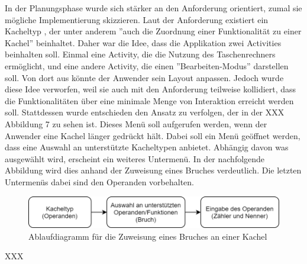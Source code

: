 In der Planungsphase wurde sich stärker an den Anforderung orientiert, zumal sie mögliche Implementierung skizzieren. Laut der Anforderung existiert ein Kacheltyp , der unter anderem ''auch die Zuordnung einer Funktionalität zu einer Kachel'' beinhaltet. Daher war die Idee, dass die Applikation zwei Activities beinhalten soll. Einmal eine Activity, die die Nutzung des Taschenrechners ermöglicht, und eine andere Activity, die einen ''Bearbeiten-Modus'' darstellen soll. Von dort aus könnte der Anwender sein Layout anpassen. Jedoch wurde diese Idee verworfen, weil sie auch mit den Anforderung teilweise kollidiert, dass die Funktionalitäten über eine minimale Menge von Interaktion erreicht werden soll. Stattdessen wurde entschieden den Ansatz zu verfolgen, der in der XXX Abbildung 7 zu sehen ist. Dieses Menü soll aufgerufen werden, wenn der Anwender eine Kachel länger gedrückt hält. 
Dabei soll ein Menü geöffnet werden, dass eine Auswahl an unterstützte Kacheltypen anbietet. Abhängig davon was ausgewählt wird, erscheint ein weiteres Untermenü. In der nachfolgende Abbildung wird dies anhand der Zuweisung eines Bruches verdeutlich. Die letzten Untermenüs dabei sind den Operanden vorbehalten.
 

\begin{figure}[!h]
	\includegraphics[width=1\columnwidth]{img/ablaufdiagramm-fuer-zuweisung}
	\caption[Ablaufdiagramm für die Zuweisung eines Bruches an einer Kachel]{Ablaufdiagramm für die Zuweisung eines Bruches an einer Kachel\footnotemark}
\end{figure}


XXX















